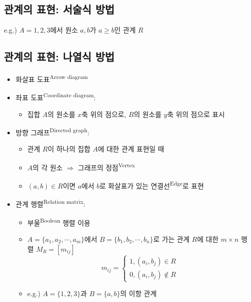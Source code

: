\subsection{관계의 표현: 서술식 방법}
e.g.) $A={1, 2, 3}$에서 원소 $a, b$가 $a \geq b$인 관계 $R$

\subsection{관계의 표현: 나열식 방법}
\begin{itemize}
    \item 화살표 도표\textsuperscript{Arrow diagram}
    \item 좌표 도표\textsuperscript{Coordinate diagram}:
          \begin{itemize}
              \item 집합 $A$의 원소를 $x$축 위의 점으로, $B$의 원소를 $y$축 위의 점으로 표시
          \end{itemize}
    \item 방향 그래프\textsuperscript{Directed graph}:
          \begin{itemize}
              \item 관계 $R$이 하나의 집합 $A$에 대한 관계 표현일 때
              \item $A$의 각 원소 $\Rightarrow$ 그래프의 정점\textsuperscript{Vertex}
              \item $(a, b) \in R$이면 $a$에서 $b$로 화살표가 있는 연결선\textsuperscript{Edge}로 표현
          \end{itemize}
    \item 관계 행렬\textsuperscript{Relation matrix}:
          \begin{itemize}
              \item 부울\textsuperscript{Boolean} 행렬 이용
              \item $A = \{a_1, a_2, \cdots, a_m\}$에서 $B = \{b_1, b_2, \cdots, b_n\}$로 가는 관계 $R$에 대한 $m \times n$ 행렬 $M_R=[m_{ij}]$
                    $$m_{ij} = \begin{cases}
                            1, (a_i, b_j) \in R \\
                            0, (a_i, b_j) \not\in R
                        \end{cases}$$
              \item e.g.) $A=\{1, 2, 3\}$과 $B=\{a, b\}$의 이항 관계


\end{itemize}
\end{itemize}
